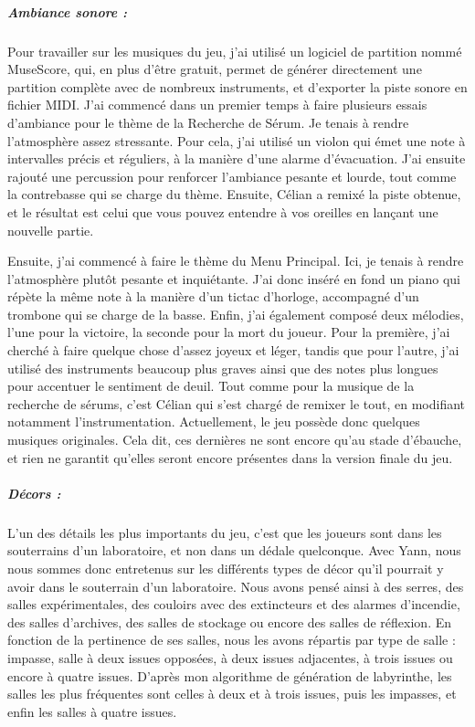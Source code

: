 \documentclass{article}
\begin{document}
\subparagraph{Ambiance sonore :}

Pour travailler sur les musiques du jeu, j'ai utilisé un logiciel de partition nommé MuseScore, qui, en plus d'être gratuit, permet de générer directement une partition complète avec de nombreux instruments, et d'exporter la piste sonore en fichier MIDI. J'ai commencé dans un premier temps à faire plusieurs essais d'ambiance pour le thème de la Recherche de Sérum. Je tenais à rendre l'atmosphère assez stressante. Pour cela, j'ai utilisé un violon qui émet une note à intervalles précis et réguliers, à la manière d'une alarme d'évacuation. J'ai ensuite rajouté une percussion pour renforcer l'ambiance pesante et lourde, tout comme la contrebasse qui se charge du thème. Ensuite, Célian a remixé la piste obtenue, et le résultat est celui que vous pouvez entendre à vos oreilles en lançant une nouvelle partie.

Ensuite, j'ai commencé à faire le thème du Menu Principal. Ici, je tenais à rendre l'atmosphère plutôt pesante et inquiétante. J'ai donc inséré en fond un piano qui répète la même note à la manière d'un tictac d'horloge, accompagné d'un trombone qui se charge de la basse. Enfin, j'ai également composé deux mélodies, l'une pour la victoire, la seconde pour la mort du joueur. Pour la première, j'ai cherché à faire quelque chose d'assez joyeux et léger, tandis que pour l'autre, j'ai utilisé des instruments beaucoup plus graves ainsi que des notes plus longues pour accentuer le sentiment de deuil. Tout comme pour la musique de la recherche de sérums, c'est Célian qui s'est chargé de remixer le tout, en modifiant notamment l'instrumentation. Actuellement, le jeu possède donc quelques musiques originales. Cela dit, ces dernières ne sont encore qu'au stade d'ébauche, et rien ne garantit qu'elles seront encore présentes dans la version finale du jeu.

\subparagraph{Décors :}

L'un des détails les plus importants du jeu, c'est que les joueurs sont dans les souterrains d'un laboratoire, et non dans un dédale quelconque. Avec Yann, nous nous sommes donc entretenus sur les différents types de décor qu'il pourrait y avoir dans le souterrain d'un laboratoire. Nous avons pensé ainsi à des serres, des salles expérimentales, des couloirs avec des extincteurs et des alarmes d'incendie, des salles d'archives, des salles de stockage ou encore des salles de réflexion. En fonction de la pertinence de ses salles, nous les avons répartis par type de salle : impasse, salle à deux issues opposées, à deux issues adjacentes, à trois issues ou encore à quatre issues. D'après mon algorithme de génération de labyrinthe, les salles les plus fréquentes sont celles à deux et à trois issues, puis les impasses, et enfin les salles à quatre issues.
\end{document}
